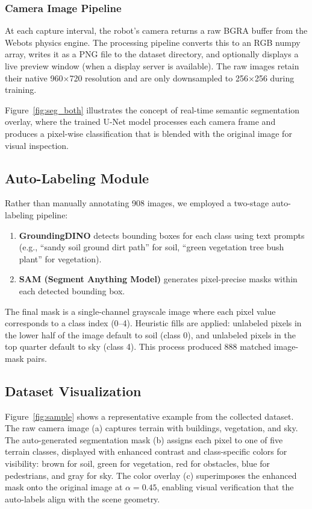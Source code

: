 \documentclass[12pt,a4paper]{article}
\begin{document}
\subsubsection{Camera Image Pipeline}

At each capture interval, the robot's camera returns a raw BGRA buffer from the Webots physics engine. The processing pipeline converts this to an RGB numpy array, writes it as a PNG file to the dataset directory, and optionally displays a live preview window (when a display server is available). The raw images retain their native 960$\times$720 resolution and are only downsampled to 256$\times$256 during training.

Figure~\ref{fig:seg_both} illustrates the concept of real-time semantic segmentation overlay, where the trained U-Net model processes each camera frame and produces a pixel-wise classification that is blended with the original image for visual inspection.

\subsection{Auto-Labeling Module}

Rather than manually annotating 908 images, we employed a two-stage auto-labeling pipeline:

\begin{enumerate}[noitemsep]
    \item \textbf{GroundingDINO} detects bounding boxes for each class using text prompts (e.g., ``sandy soil ground dirt path'' for soil, ``green vegetation tree bush plant'' for vegetation).
    \item \textbf{SAM (Segment Anything Model)} generates pixel-precise masks within each detected bounding box.
\end{enumerate}

The final mask is a single-channel grayscale image where each pixel value corresponds to a class index (0--4). Heuristic fills are applied: unlabeled pixels in the lower half of the image default to soil (class 0), and unlabeled pixels in the top quarter default to sky (class 4). This process produced 888 matched image-mask pairs.

\subsection{Dataset Visualization}

Figure~\ref{fig:sample} shows a representative example from the collected dataset. The raw camera image (a) captures terrain with buildings, vegetation, and sky. The auto-generated segmentation mask (b) assigns each pixel to one of five terrain classes, displayed with enhanced contrast and class-specific colors for visibility: brown for soil, green for vegetation, red for obstacles, blue for pedestrians, and gray for sky. The color overlay (c) superimposes the enhanced mask onto the original image at $\alpha = 0.45$, enabling visual verification that the auto-labels align with the scene geometry.
\end{document}
